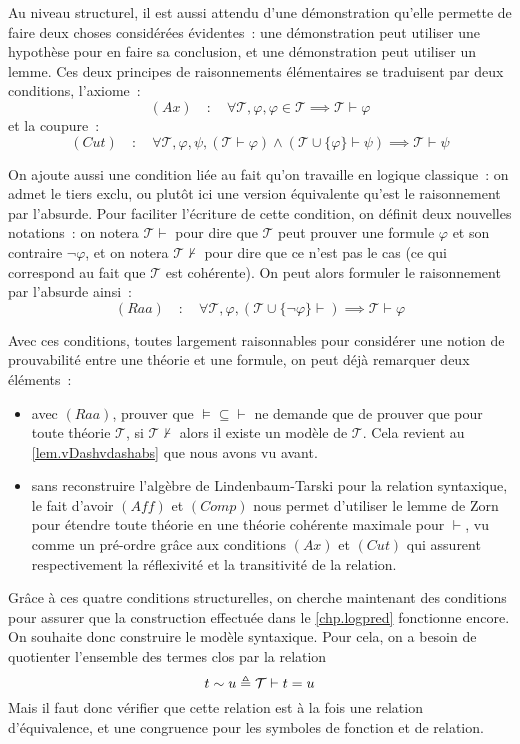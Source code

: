 Au niveau structurel, il est aussi attendu d'une démonstration qu'elle permette
de faire deux choses considérées évidentes~: une démonstration peut utiliser une
hypothèse pour en faire sa conclusion, et une démonstration peut utiliser un
lemme. Ces deux principes de raisonnements élémentaires se traduisent par deux
conditions, l'axiome~:
\[
(\textit{Ax})\quad : \quad \forall \mathcal T, \varphi, \varphi \in \mathcal T
\implies \mathcal T \vdash \varphi
\]
et la coupure~:
\[
(\textit{Cut})\quad : \quad \forall \mathcal T, \varphi, \psi,
(\mathcal T \vdash \varphi) \land (\mathcal T \cup \{\varphi\}\vdash \psi)
\implies \mathcal T \vdash \psi
\]

On ajoute aussi une condition liée au fait qu'on travaille en logique
classique~: on admet le tiers exclu, ou plutôt ici une version équivalente
qu'est le raisonnement par l'absurde. Pour faciliter l'écriture de cette
condition, on définit deux nouvelles notations~: on notera $\mathcal T \vdash$
pour dire que $\mathcal T$ peut prouver une formule $\varphi$ et son contraire
$\lnot\varphi$, et on notera $\mathcal T\nvdash$ pour dire que ce n'est pas le
cas (ce qui correspond au fait que $\mathcal T$ est cohérente). On peut alors
formuler le raisonnement par l'absurde ainsi~:
\[
(\textit{Raa})\quad : \quad \forall \mathcal T, \varphi,
(\mathcal T\cup\{\lnot \varphi\}\vdash) \implies \mathcal T \vdash \varphi
\]

Avec ces conditions, toutes largement raisonnables pour considérer une notion de
prouvabilité entre une théorie et une formule, on peut déjà remarquer deux
éléments~:
\begin{itemize}
\item avec $(\textit{Raa})$, prouver que $\vDash\subseteq \vdash$ ne demande que
  de prouver que pour toute théorie $\mathcal T$, si $\mathcal T\nvdash$ alors
  il existe un modèle de $\mathcal T$. Cela revient au
  \cref{lem.vDashvdashabs} que nous avons vu avant.
\item sans reconstruire l'algèbre de Lindenbaum-Tarski pour la
  relation syntaxique, le fait d'avoir $(\textit{Aff})$ et $(\textit{Comp})$
  nous permet d'utiliser le lemme de Zorn pour étendre toute théorie en une
  théorie cohérente maximale pour $\vdash$, vu comme un pré-ordre grâce aux
  conditions $(\textit{Ax})$ et $(\textit{Cut})$ qui assurent respectivement
  la réflexivité et la transitivité de la relation.
\end{itemize}

Grâce à ces quatre conditions structurelles, on cherche maintenant des
conditions pour assurer que la construction effectuée dans le \cref{chp.logpred}
fonctionne encore. On souhaite donc construire le modèle syntaxique. Pour cela,
on a besoin de quotienter l'ensemble des termes clos par la relation
\[t \sim u \triangleq \mathcal T \vdash t = u\]
Mais il faut donc vérifier que cette relation est à la fois une relation
d'équivalence, et une congruence pour les symboles de fonction et de relation.

